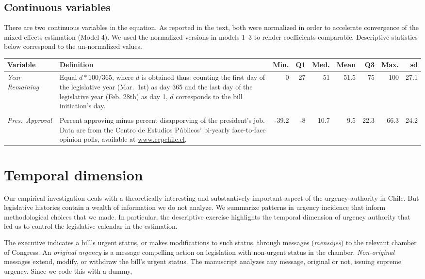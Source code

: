 \documentclass[letter,12pt]{article}
\begin{document}
\subsection{Continuous variables}

There are two continuous variables in the equation. As reported in the text, both were normalized in order to accelerate convergence of the mixed effects estimation (Model 4). We used the normalized versions in models 1--3 to render coefficients comparable. Descriptive statistics below correspond to the un-normalized values.

\begin{footnotesize}
\singlespacing
\begin{tabularx}{\textwidth}{lXrrrrrrr} %
          Variable  & Definition &  Min.&  Q1 & Med. & Mean &  Q3  &  Max. &   sd \\ [.5ex] \hline
\emph{Year Remaining}& Equal $d*100/365$, where $d$ is obtained thus: counting the first day of the legislative year (Mar.\ 1st) as day 365 and the last day of the legislative year (Feb. 28th) as day 1, $d$ corresponds to the bill initiation's day.     &  0   &  27 & 51   & 51.5 & 75   & 100   &   27.1 \\ [.5ex]
\\ [-1ex]
\emph{Pres.~Approval}& Percent approving minus percent disapporving of the president's job. Data are from the Centro de Estudios Públicos' bi-yearly face-to-face opinion polls, available at \url{www.cepchile.cl}. &-39.2 & -8 &  10.7 &  9.5 & 22.3 &  66.3 &   24.2 \\ \hline
\end{tabularx}
\doublespacing
\end{footnotesize}
  
  \section{Temporal dimension}\label{s:temp-dim}

Our empirical investigation deals with a theoretically interesting and substantively important aspect of the urgency authority in Chile. But legislative histories contain a wealth of information we do not analyze. We summarize patterns in urgency incidence that inform methodological choices that we made. In particular, the descriptive exercise highlights the temporal dimension of urgency authority that led us to control the legislative calendar in the estimation. 

The executive indicates a bill's urgent status, or makes modifications to such status, through messages (\emph{mensajes}) to the relevant chamber of Congress. An \emph{original urgency} is a message compelling action on legislation with non-urgent status in the chamber. \emph{Non-original} messages extend, modify, or withdraw the bill's urgent status. The manuscript analyzes any message, original or not, issuing supreme urgency. Since we code this with a dummy,
\end{document}

